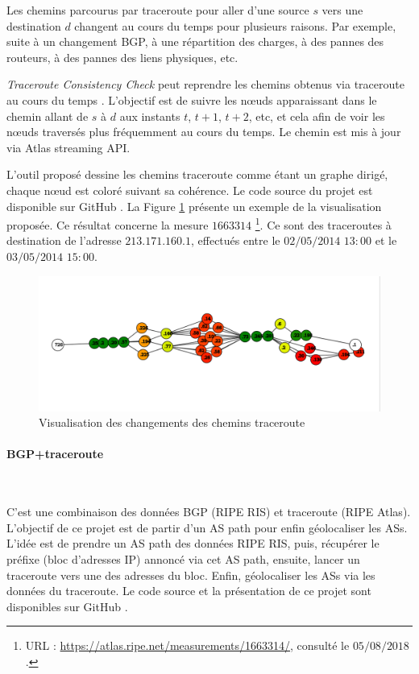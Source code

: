 Les chemins parcourus par traceroute pour aller d'une source $s$ vers une destination $d$ changent au cours du temps pour plusieurs raisons. Par exemple, suite   à un changement BGP, à une  répartition des charges, à des pannes des routeurs,  à des pannes des liens physiques, etc.

\textit{Traceroute Consistency Check} peut reprendre les chemins obtenus via traceroute au cours du temps . L'objectif est de suivre les  n\oe{}uds apparaissant dans le chemin allant de  $s$ à $d$ aux instants $t$, $t+1$, $t+2$, etc, et cela afin de voir les n\oe{}uds traversés plus fréquemment au cours du temps. Le chemin est mis à jour via Atlas streaming API. 

L'outil proposé dessine les chemins traceroute comme étant un graphe dirigé, chaque n\oe{}ud est coloré suivant sa cohérence. Le code source du projet est disponible sur GitHub \cite{Traceroute-consistency-check}. La Figure \ref{fig:Traceroute-consistency-check} présente un exemple de la visualisation proposée. Ce résultat concerne la mesure $1663314$ \footnote{URL : \url{https://atlas.ripe.net/measurements/1663314/}, consulté le $05/08/2018$.}. Ce sont des traceroutes à destination de l'adresse $213.171.160.1$, effectués entre le $02/05/2014$ $13:00$ et le $03/05/2014$ $15:00$.

\begin{figure}[h]
	\centering
	\includegraphics[width=1\linewidth]{illustrations/traceroute-consitance.png}
	\caption{Visualisation des changements des chemins traceroute \cite{Traceroute-consistency-check}}
	\label{fig:Traceroute-consistency-check}
\end{figure}

\paragraph{BGP+traceroute} ~

C'est une combinaison des données BGP (RIPE RIS) et traceroute (RIPE Atlas). L'objectif de ce projet est de partir d'un AS path pour enfin géolocaliser les ASs. 
L'idée est de prendre un AS path des données RIPE RIS, puis, récupérer le préfixe (bloc d'adresses IP) annoncé via cet AS path, ensuite, lancer un traceroute vers une des adresses du bloc. Enfin, géolocaliser les ASs via les données du traceroute. 
Le code source et la présentation de ce projet sont disponibles sur GitHub \cite{bgp-traceroutes,pres-bgp-traceroute}. 


